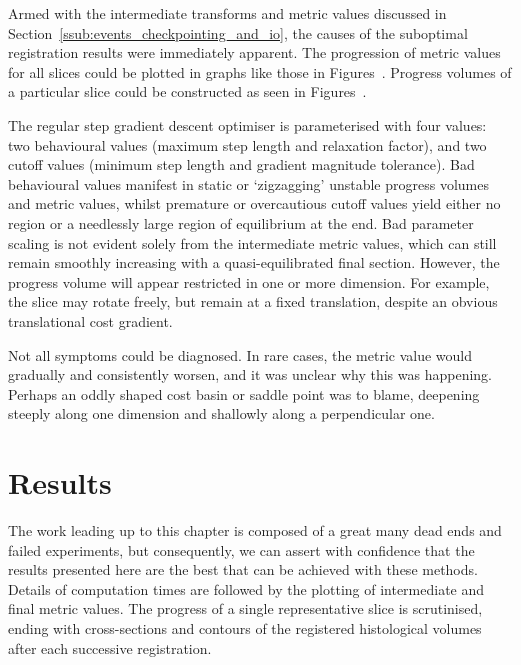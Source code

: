       Armed with the intermediate transforms and metric values discussed in Section~\ref{ssub:events_checkpointing_and_io}, the causes of the suboptimal registration results were immediately apparent. The progression of metric values for all slices could be plotted in graphs like those in Figures~. Progress volumes of a particular slice could be constructed as seen in Figures~.
			
			The regular step gradient descent optimiser is parameterised with four values: two behavioural values (maximum step length and relaxation factor), and two cutoff values (minimum step length and gradient magnitude tolerance). Bad behavioural values manifest in static or `zigzagging' unstable progress volumes and metric values, whilst premature or overcautious cutoff values yield either no region or a needlessly large region of equilibrium at the end. Bad parameter scaling is not evident solely from the intermediate metric values, which can still remain smoothly increasing with a quasi-equilibrated final section. However, the progress volume will appear restricted in one or more dimension. For example, the slice may rotate freely, but remain at a fixed translation, despite an obvious translational cost gradient.
			
			Not all symptoms could be diagnosed. In rare cases, the metric value would gradually and consistently worsen, and it was unclear why this was happening. Perhaps an oddly shaped cost basin or saddle point was to blame, deepening steeply along one dimension and shallowly along a perpendicular one.
   
\section{Results} %
\label{sec:registration_results}
	The work leading up to this chapter is composed of a great many dead ends and failed experiments, but consequently, we can assert with confidence that the results presented here are the best that can be achieved with these methods. Details of computation times are followed by the plotting of intermediate and final metric values. The progress of a single representative slice is scrutinised, ending with cross-sections and contours of the registered histological volumes after each successive registration.
	
